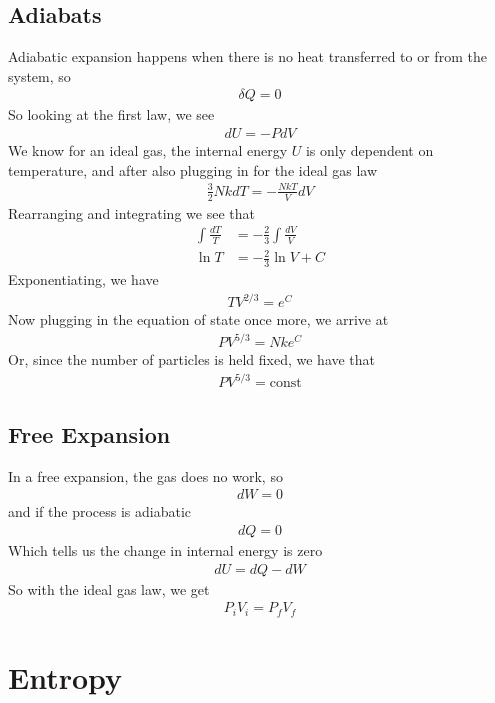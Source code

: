 \subsection{Adiabats}
Adiabatic expansion happens when there is no heat transferred to or from the system, so
\begin{align}
    \delta Q = 0
\end{align}
So looking at the first law, we see
\begin{align}
    dU = -PdV
\end{align}
We know for an ideal gas, the internal energy $U$ is only dependent on temperature, and after also plugging in for the ideal gas law
\begin{align}
    \frac{3}{2}Nk dT = -\frac{NkT}{V}dV
\end{align}
Rearranging and integrating we see that
\begin{align}
    \int \frac{dT}{T} &= -\frac{2}{3} \int \frac{dV}{V}\\
    \ln T &= -\frac{2}{3}\ln V + C
\end{align}
Exponentiating, we have
\begin{align}
    TV^{2/3} = e^C
\end{align}
Now plugging in the equation of state once more, we arrive at
\begin{align}
    PV^{5/3} = Nke^C
\end{align}
Or, since the number of particles is held fixed, we have that 
\begin{align}
    PV^{5/3} = \textrm{const}
\end{align}

\subsection{Free Expansion}
In a free expansion, the gas does no work, so
\begin{align}
    dW = 0
\end{align}
and if the process is adiabatic
\begin{align}
    dQ = 0
\end{align}
Which tells us the change in internal energy is zero
\begin{align}
    dU = dQ - dW
\end{align}
So with the ideal gas law, we get
\begin{align}
    P_iV_i = P_fV_f
\end{align}

\section{Entropy}

